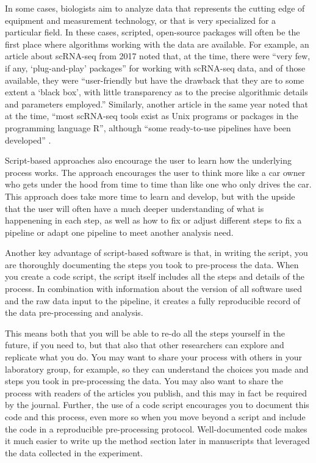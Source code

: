 \documentclass[]{tufte-book}
\begin{document}
In some cases, biologists aim to analyze data that represents the cutting edge
of equipment and measurement technology, or that is very specialized for a
particular field. In these cases, scripted, open-source packages will often be
the first place where algorithms working with the data are available. For
example, an article about scRNA-seq from 2017 noted that, at the time, there
were ``very few, if any, `plug-and-play' packages'' for working with scRNA-seq
data, and of those available, they were ``user-friendly but have the drawback
that they are to some extent a `black box', with little transparency as to the
precise algorithmic details and parameters employed.'' \citep{haque2017practical}
Similarly, another article in the same year noted that at the time, ``most
scRNA-seq tools exist as Unix programs or packages in the programming language
R'', although ``some ready-to-use pipelines have been developed''
\citep{perkel2017single}.

Script-based approaches also encourage the user to learn how the underlying process
works. The approach encourages the user to think more like a car owner who gets
under the hood from time to time than like one who only drives the car. This
approach does take more time to learn and develop, but with the upside that the
user will often have a much deeper understanding of what is happenening in each
step, as well as how to fix or adjust different steps to fix a pipeline or
adapt one pipeline to meet another analysis need.

Another key advantage of script-based software is that, in writing the
script, you are thoroughly documenting the steps you took to pre-process the
data. When you create a code script, the script itself includes all
the steps and details of the process. In combination with information about the
version of all software used and the raw data input to the pipeline, it creates
a fully reproducible record of the data pre-processing and analysis.

This means both that you will be able to re-do all the steps
yourself in the future, if you need to, but that also that other researchers can
explore and replicate what you do. You may want to share your process with
others in your laboratory group, for example, so they can understand the choices
you made and steps you took in pre-processing the data. You may also want to
share the process with readers of the articles you publish, and this may in fact
be required by the journal. Further, the use of a code script encourages you to
document this code and this process, even more so when you move beyond a script
and include the code in a reproducible pre-processing protocol. Well-documented
code makes it much easier to write up the method section later in manuscripts
that leveraged the data collected in the experiment.
\end{document}
